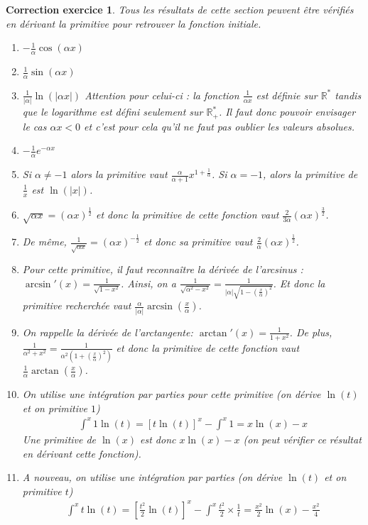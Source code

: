 \documentclass[12pt]{article}
\newtheorem{correction}{\bf Correction exercice}
\newenvironment{cor}{
\begin{correction}\smallskip\normalfont}{\end{correction}
}
\newcommand*{\R}{\mathbb{R}}
\newif\ifcorrige\corrigetrue
\begin{document}
\ifcorrige
\color{magenta}
\begin{cor}
Tous les r\'esultats de cette section peuvent \^etre v\'erifi\'es en d\'erivant la primitive
pour retrouver la fonction initiale.
\begin{enumerate}
\item $- \frac{1}{\alpha} \cos(\alpha x)$
\item $\frac{1}{\alpha} \sin(\alpha x)$
\item $\frac{1}{|\alpha|} \ln(|\alpha x|)$
  Attention pour celui-ci : la fonction $\frac{1}{\alpha x}$ est d\'efinie sur $\R^*$
  tandis que le logarithme est d\'efini seulement sur $\R_+^*$.
  Il faut donc pouvoir envisager le cas $\alpha x<0$ et c'est pour cela qu'il ne faut pas oublier les valeurs
  absolues.
\item $- \frac{1}{\alpha}e^{-\alpha x}$
\item Si $\alpha \neq -1$ alors la primitive vaut $\frac{\alpha}{\alpha+1} x^{1+\frac{1}{\alpha}}$.
  Si $\alpha = -1$, alors la primitive de $\frac{1}{x}$ est $\ln(|x|)$.
\item $\sqrt{\alpha x} = (\alpha x)^{\frac12}$ et donc la primitive de cette fonction vaut
  $\frac2{3\alpha} (\alpha x)^{\frac32}$.
\item De m\^eme, $\frac{1}{\sqrt{\alpha x}} = (\alpha x)^{-\frac12}$
  et donc sa primitive vaut
  $\frac{2}{\alpha}(\alpha x)^{\frac12}$.
\item Pour cette primitive, il faut reconna\^itre la d\'eriv\'ee de l'arcsinus :
  $\arcsin'(x) = \frac{1}{\sqrt{1-x^2}}$.
  Ainsi, on a $\frac{1}{\sqrt{\alpha^2-x^2}} = \frac{1}{|\alpha|\sqrt{1-(\frac{x}{\alpha})^2}}$.
  Et donc la primitive recherch\'ee vaut
  $\frac{\alpha}{|\alpha|}\arcsin(\frac{x}{\alpha})$.
\item On rappelle la d\'eriv\'ee de l'arctangente: $\arctan'(x) = \frac{1}{1+x^2}$.
  De plus, $\frac{1}{\alpha^2 + x^2} = \frac{1}{\alpha^2(1 + (\frac{x}{\alpha})^2)}$
  et donc la primitive de cette fonction vaut
  $\frac{1}{\alpha}\arctan(\frac{x}{\alpha})$.
\item On utilise une int\'egration par parties pour cette primitive (on d\'erive $\ln(t)$ et on primitive $1$)
  \begin{align*}
    \int^x 1 \ln(t) = [t \ln(t)]^x - \int^x 1 = x \ln(x) - x
  \end{align*}
  Une primitive de $\ln(x)$ est donc $x \ln(x) - x$
  (on peut v\'erifier ce r\'esultat en d\'erivant cette fonction).

\item A nouveau, on utilise une int\'egration par parties
  (on d\'erive $\ln(t)$ et on primitive $t$)
  \begin{align*}
    \int^x t \ln(t) = [\frac{t^2}{2} \ln(t)]^x - \int^x \frac{t^2}{2} \times \frac{1}{t}
    = \frac{x^2}{2} \ln(x) - \frac{x^2}{4}
  \end{align*}


\end{enumerate}
\end{cor}
\end{document}
